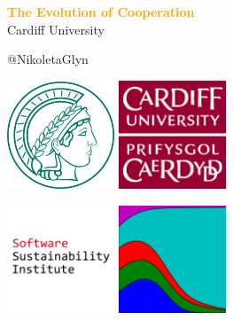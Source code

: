 \documentclass{beamer}
\begin{document}
\begin{frame}
    \begin{center}
        \LARGE{\textbf{\textcolor{orange}{The Evolution of Cooperation}}} \\

        \vspace{1.5cm}
        \normalsize{Cardiff University}

        \vspace{1cm}
        \normalsize{@NikoletaGlyn}

    \end{center}
\end{frame}

\begin{frame}
    \begin{center}
    \includegraphics[width=0.24\textwidth]{static/mpi.jpg}\hspace{6pt}
    \includegraphics[width=0.24\textwidth, height=0.245\textwidth]{static/cardiff_uni_logo.png}\vspace{10pt}

    \hspace{2pt}\includegraphics[width=0.24\textwidth]{static/ssi-logo.png} \hspace{1pt}
    \includegraphics[width=0.24\textwidth]{static/axelrod-logo.png}

    \end{center}
\end{frame}
\end{document}
